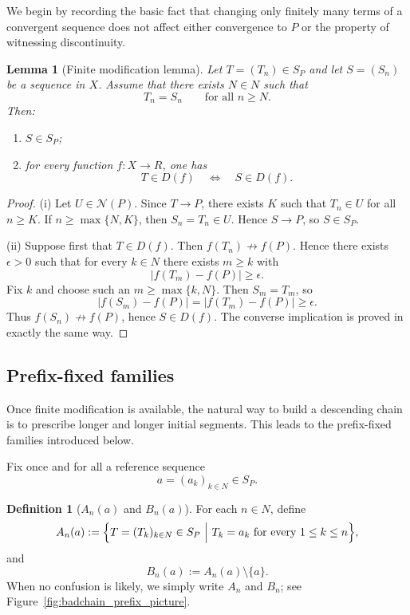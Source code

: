 \documentclass[11pt]{amsart}
\theoremstyle{plain}
\newtheorem{lemma}[theorem]{Lemma}
\theoremstyle{definition}
\newtheorem{definition}[theorem]{Definition}
\theoremstyle{remark}
\newcommand{\Sp}{\mathcal{S}_P}
\newcommand{\N}{\mathbb{N}}
\newcommand{\R}{\mathbb{R}}
\newcommand{\e}{\epsilon}
\def\Sp{S_P}%
\def\N{N}%
\def\R{R}%
\begin{document}
We begin by recording the basic fact that changing only finitely many terms of a convergent sequence does not affect either convergence to $P$ or the property of witnessing discontinuity.

\begin{lemma}[Finite modification lemma]\label{lem:finite_modification}
Let $T=(T_n)\in\Sp$ and let $S=(S_n)$ be a sequence in $X$.
Assume that there exists $N\in\N$ such that
\[
T_n=S_n \qquad\text{for all } n\ge N.
\]
Then:
\begin{enumerate}[label=(\roman*)]
\item $S\in\Sp$;
\item for every function $f:X\to\R$, one has
\[
T\in D(f)\quad\Longleftrightarrow\quad S\in D(f).
\]
\end{enumerate}
\end{lemma}

\begin{proof}
(i) Let $U\in\mathcal N(P)$.
Since $T\to P$, there exists $K$ such that $T_n\in U$ for all $n\ge K$.
If $n\ge \max\{N,K\}$, then $S_n=T_n\in U$.
Hence $S\to P$, so $S\in\Sp$.

(ii) Suppose first that $T\in D(f)$.
Then $f(T_n)\not\to f(P)$.
Hence there exists $\e>0$ such that for every $k\in\N$ there exists $m\ge k$ with
\[
|f(T_m)-f(P)|\ge \e.
\]
Fix $k$ and choose such an $m\ge \max\{k,N\}$.
Then $S_m=T_m$, so
\[
|f(S_m)-f(P)|=|f(T_m)-f(P)|\ge \e.
\]
Thus $f(S_n)\not\to f(P)$, hence $S\in D(f)$.
The converse implication is proved in exactly the same way.
\end{proof}

\subsection{Prefix-fixed families}

Once finite modification is available, the natural way to build a descending chain is to prescribe longer and longer initial segments.
This leads to the prefix-fixed families introduced below.

Fix once and for all a reference sequence
\[
a=(a_k)_{k\in\N}\in\Sp.
\]

\begin{definition}[$A_n(a)$ and $B_n(a)$]\label{def:AnBn}
For each $n\in\N$, define
\[
A_n(a):=\Bigl\{T=(T_k)_{k\in\N}\in\Sp \ \Big|\ T_k=a_k \text{ for every } 1\le k\le n\Bigr\},
\]
and
\[
B_n(a):=A_n(a)\setminus\{a\}.
\]
When no confusion is likely, we simply write $A_n$ and $B_n$; see Figure~\ref{fig:badchain_prefix_picture}.
\end{definition}
\end{document}

